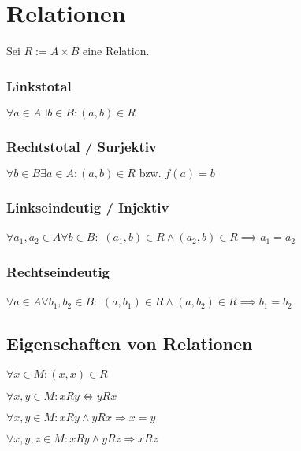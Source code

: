 \section*{Relationen}

Sei $R := A \times B$ eine Relation.

\subsubsection*{Linkstotal}
$\forall a \in A \exists b \in B : (a,b)  \in R$

\subsubsection*{Rechtstotal / Surjektiv}
$\forall b \in B \exists a \in A : (a,b) \in R \text{ bzw. } f(a)=b$

\subsubsection*{Linkseindeutig / Injektiv}
$\forall a_1, a_2 \in A \forall b \in B :$ \newline
\hspace*{5mm} $(a_1,b) \in R \land (a_2,b) \in R \implies a_1=a_2$

\subsubsection*{Rechtseindeutig}
$\forall a \in A \forall b_1, b_2 \in B:$ \newline
\hspace*{5mm} $(a,b_1) \in R \land (a,b_2) \in R \implies b_1=b_2$

\subsection*{Eigenschaften von Relationen}

\begin{description}[leftmargin=!,labelwidth=25mm]
	\item[reflexiv] $\forall x \in M : (x, x) \in R$
	\item[symmetrisch] $\forall x, y \in M : xRy \Leftrightarrow yRx$
	\item[antisymmetrisch] $\forall x, y \in M : xRy \land yRx \Rightarrow x=y$
	\item[transitiv] $\forall x, y, z \in M : xRy \land yRz \Rightarrow xRz$
\end{description}

